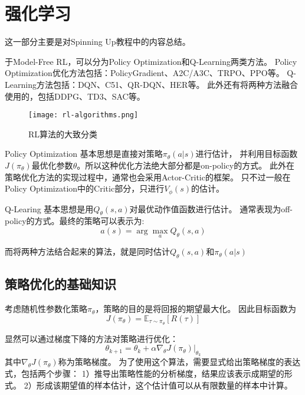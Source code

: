 \chapter{强化学习}
这一部分主要是对Spinning Up教程中的内容总结。

于Model-Free RL，可以分为Policy Optimization和Q-Learning两类方法。
Policy Optimization优化方法包括：PolicyGradient、A2C/A3C、TRPO、PPO等。
Q-Learning方法包括：DQN、C51、QR-DQN、HER等。
此外还有将两种方法融合使用的，包括DDPG、TD3、SAC等。

\begin{figure}[htbp]
	\figskip 
	\centering
	\texttt{[image: rl-algorithms.png]}	  
	\caption{\label{fig: rl} RL算法的大致分类}
\end{figure}

Policy Optimization 基本思想是直接对策略$\pi_\theta(a|s)$进行估计，
并利用目标函数$J(\pi_\theta)$最优化参数$\theta$。所以这种优化方法绝大部分都是on-policy的方式。
此外在策略优化方法的实现过程中，通常也会采用Actor-Critic的框架。
只不过一般在Policy Optimization中的Critic部分，只进行$V_\phi(s)$的估计。

Q-Learing 基本思想是用$Q_\theta(s,a)$对最优动作值函数进行估计。
通常表现为off-policy的方式。最终的策略可以表示为:
\begin{equation*}
a(s) = \arg \max_a Q_\theta(s,a)
\end{equation*}

而将两种方法结合起来的算法，就是同时估计$Q_\theta(s,a)$和$\pi_\theta(a|s)$

\section{策略优化的基础知识}
考虑随机性参数化策略$\pi_\theta$，策略的目的是将回报的期望最大化。
因此目标函数为
\begin{equation*}
    J(\pi_\theta) = \mathbb{E}_{\tau\sim\pi_\theta}[R(\tau)]
\end{equation*}

显然可以通过梯度下降的方法对策略进行优化：
\begin{equation*}
    \theta_{k+1} = \theta_k + \alpha \nabla_\theta J(\pi_\theta)|_{\theta_k}
\end{equation*}
其中$\nabla_\theta J(\pi_\theta)$称为策略梯度。
为了使用这个算法，需要显式给出策略梯度的表达式，包括两个步骤：
1）推导出策略性能的分析梯度，结果应该表示成期望的形式。
2）形成该期望值的样本估计，这个估计值可以从有限数量的样本中计算。

